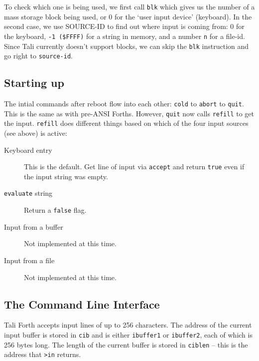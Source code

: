 To check which one is being used, we first call
\texttt{blk} which gives us the number of a mass storage
block being used, or 0 for the `user input device' (keyboard). In the second
case, we use SOURCE-ID to find out where input is coming from: 0 for the
keyboard, \texttt{-1 (\$FFFF)} for a string in memory, and a number \texttt{n}
for a file-id. Since Tali currently doesn't support blocks, we
can skip the \texttt{blk} instruction and go right to \texttt{source-id}. 


\subsection{Starting up}

The intial commands after reboot flow into each other: \texttt{cold} to
\texttt{abort} to \texttt{quit}. This is the same as with pre-ANSI Forths.
However, \texttt{quit} now calls \texttt{refill} to get the input.
\texttt{refill} does different things based on which of the four input sources
(see above) is active: 

\begin{description} 
        \item [Keyboard entry] This is the default. Get line of input via
                \texttt{accept} and return \texttt{true} even if the input string was
                empty.
        \item [\texttt{evaluate} string] Return a \texttt{false} flag.
        \item [Input from a buffer] Not implemented at this time.
        \item [Input from a file] Not implemented at this time.
\end{description}


\subsection{The Command Line Interface}

Tali Forth accepts input lines of up to 256 characters. The
address of the current input buffer is stored in
\texttt{cib} and is either
\texttt{ibuffer1} or \texttt{ibuffer2}, each of which is 256 bytes long. The
length of the current buffer is stored in \texttt{ciblen} -- this is the address
that \texttt{>in} returns. 

